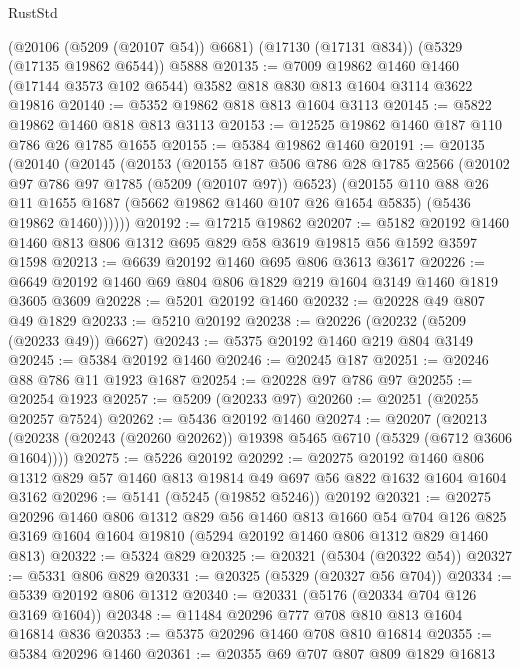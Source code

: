\begin{lexlean}{RustStd}
\begin{coremodule}
    (@20106 (@5209 (@20107 @54)) @6681)
    (@17130 (@17131 @834))
    (@5329 (@17135 @19862 @6544))
    @5888
@20135 := @7009
    @19862
    @1460
    @1460
    (@17144 @3573 @102 @6544)
    @3582
    @818
    @830
    @813
    @1604
    @3114
    @3622
    @19816
@20140 := @5352 @19862 @818 @813 @1604 @3113
@20145 := @5822 @19862 @1460 @818 @813 @3113
@20153 := @12525 @19862 @1460 @187 @110 @786 @26 @1785 @1655
@20155 := @5384 @19862 @1460
@20191 := @20135
    (@20140
      (@20145
        (@20153
          (@20155
            @187
            @506
            @786
            @28
            @1785
            @2566
            (@20102 @97 @786 @97 @1785 (@5209 (@20107 @97)) @6523)
            (@20155
              @110
              @88
              @26
              @11
              @1655
              @1687
              (@5662 @19862 @1460 @107 @26 @1654 @5835)
              (@5436 @19862 @1460))))))
@20192 := @17215 @19862
@20207 := @5182 @20192 @1460 @1460 @813 @806 @1312 @695 @829 @58 @3619 @19815 @56 @1592 @3597 @1598
@20213 := @6639 @20192 @1460 @695 @806 @3613 @3617
@20226 := @6649 @20192 @1460 @69 @804 @806 @1829 @219 @1604 @3149 @1460 @1819 @3605 @3609
@20228 := @5201 @20192 @1460
@20232 := @20228 @49 @807 @49 @1829
@20233 := @5210 @20192
@20238 := @20226 (@20232 (@5209 (@20233 @49)) @6627)
@20243 := @5375 @20192 @1460 @219 @804 @3149
@20245 := @5384 @20192 @1460
@20246 := @20245 @187
@20251 := @20246 @88 @786 @11 @1923 @1687
@20254 := @20228 @97 @786 @97
@20255 := @20254 @1923
@20257 := @5209 (@20233 @97)
@20260 := @20251 (@20255 @20257 @7524)
@20262 := @5436 @20192 @1460
@20274 := @20207
    (@20213 (@20238 (@20243 (@20260 @20262)) @19398 @5465 @6710 (@5329 (@6712 @3606 @1604))))
@20275 := @5226 @20192
@20292 := @20275
    @20192
    @1460
    @806
    @1312
    @829
    @57
    @1460
    @813
    @19814
    @49
    @697
    @56
    @822
    @1632
    @1604
    @1604
    @3162
@20296 := @5141 (@5245 (@19852 @5246)) @20192
@20321 := @20275
    @20296
    @1460
    @806
    @1312
    @829
    @56
    @1460
    @813
    @1660
    @54
    @704
    @126
    @825
    @3169
    @1604
    @1604
    @19810
    (@5294 @20192 @1460 @806 @1312 @829 @1460 @813)
@20322 := @5324 @829
@20325 := @20321 (@5304 (@20322 @54))
@20327 := @5331 @806 @829
@20331 := @20325 (@5329 (@20327 @56 @704))
@20334 := @5339 @20192 @806 @1312
@20340 := @20331 (@5176 (@20334 @704 @126 @3169 @1604))
@20348 := @11484 @20296 @777 @708 @810 @813 @1604 @16814 @836
@20353 := @5375 @20296 @1460 @708 @810 @16814
@20355 := @5384 @20296 @1460
@20361 := @20355 @69 @707 @807 @809 @1829 @16813

\end{coremodule}
\end{lexlean}
